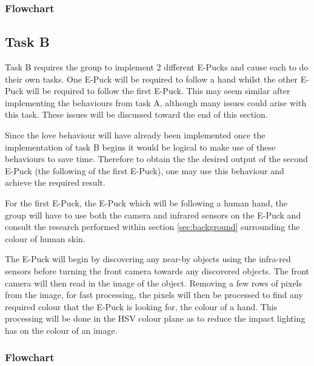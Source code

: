 \subsubsection{Flowchart}

\subsection{Task B}
Task B requires the group to implement 2 different E-Pucks and cause each to do their own tasks. One E-Puck will be required to follow a hand whilst the other E-Puck will be required to follow the first E-Puck. This may seem similar after implementing the behaviours from task A, although many issues could arise with this task. These issues will be discussed toward the end of this section.

Since the love behaviour will have already been implemented once the implementation of task B begins it would be logical to make use of these behaviours to save time. Therefore to obtain the the desired output of the second E-Puck (the following of the first E-Puck), one may use this behaviour and achieve the required result.

For the first E-Puck, the E-Puck which will be following a human hand, the group will have to use both the camera and infrared sensors on the E-Puck and consult the research performed within section \ref{sec:background} surrounding the colour of human skin.

The E-Puck will begin by discovering any near-by objects using the infra-red sensors before turning the front camera towards any discovered objects. The front camera will then read in the image of the object. Removing a few rows of pixels from the image, for fast processing, the pixels will then be processed to find any required colour that the E-Puck is looking for, the colour of a hand. This processing will be done in the HSV colour plane as to reduce the impact lighting has on the colour of an image.

\subsubsection{Flowchart}

